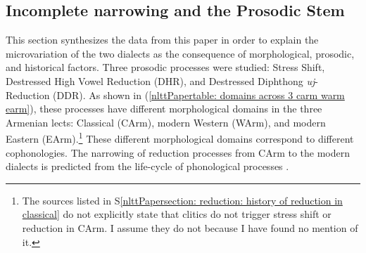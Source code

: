 \subsection{Incomplete narrowing and the Prosodic Stem }\label{nlttPapersection: reduction: history of reduction in classical: discussion}
This section synthesizes the data from this paper in order to explain the microvariation of the two dialects as the consequence of morphological, prosodic, and historical factors. Three prosodic processes were studied: Stress Shift, Destressed High Vowel Reduction (DHR), and Destressed Diphthong \textit{uj}-Reduction (DDR). As shown in (\ref{nlttPapertable: domains across 3 carm warm earm}), these processes have different morphological domains in the three Armenian lects: Classical (CArm), modern Western (WArm), and modern Eastern (EArm).\footnote{ The sources listed in S\ref{nlttPapersection: reduction: history of reduction in classical} do not {explicitly} state that clitics do not trigger stress shift or reduction in CArm. I assume they do not because I have found no mention of it. } These different morphological domains correspond to different cophonologies. The narrowing of reduction processes from CArm to the modern dialects is predicted from the life-cycle of phonological processes \citep{Ramsammy-2015-LifeCyclephonoDialectalTypology}.









